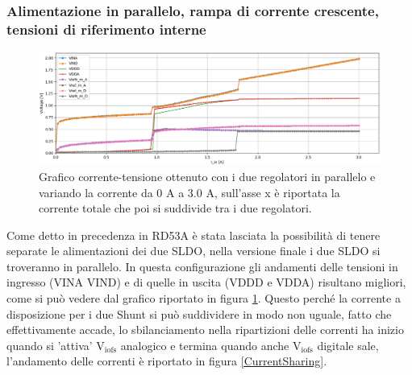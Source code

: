 % 
%

\subsubsection{Alimentazione in parallelo, rampa di corrente crescente, tensioni di riferimento interne} 
\begin{figure}[h]
\centering
\includegraphics[width=\textwidth]{Immagini/PUI}
\caption{Grafico corrente-tensione ottenuto con i due regolatori in parallelo e variando la corrente da 0 A a 3.0 A, sull'asse x è riportata la corrente totale che poi si suddivide tra i due regolatori.}
\label{PUI}
\end{figure}
Come detto in precedenza in RD53A è stata lasciata la possibilità di tenere separate le alimentazioni dei due SLDO, nella versione finale i due SLDO si troveranno in parallelo. 
In questa configurazione gli andamenti delle tensioni in ingresso (VINA VIND) e di quelle in uscita (VDDD e VDDA) risultano migliori, come si può vedere dal grafico riportato in figura \ref{PUI}. 
Questo perché la corrente a disposizione per i due Shunt si può suddividere in modo non uguale, fatto che effettivamente accade, lo sbilanciamento nella ripartizioni delle correnti ha inizio quando si 'attiva' $\mathrm{V_{iofs}}$ analogico e termina quando anche $\mathrm{V_{iofs}}$  digitale sale, l'andamento delle correnti è riportato in figura \ref{CurrentSharing}.
% 
%


